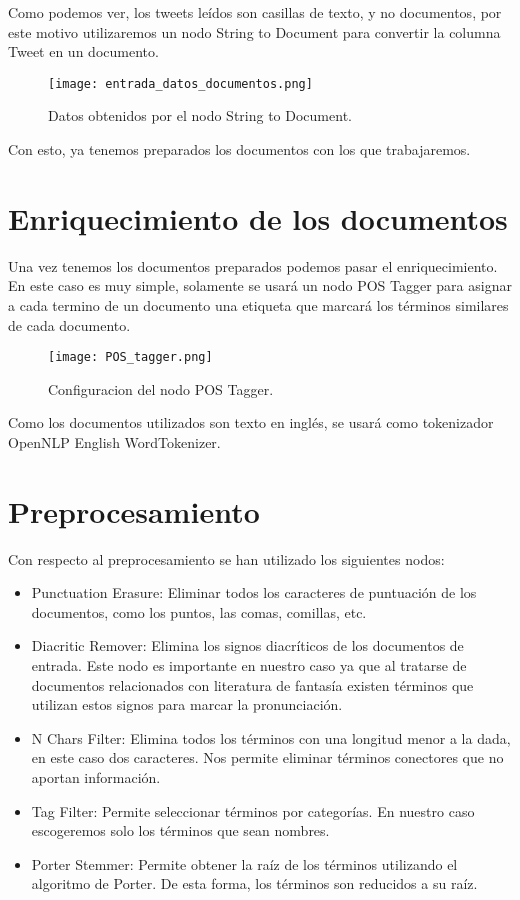 Como podemos ver, los tweets leídos son casillas de texto, y no documentos, por este motivo utilizaremos un nodo String to Document para convertir la columna Tweet en un documento.


\begin{figure}[H]
	\centering
	\texttt{[image: entrada\_datos\_documentos.png]}
	\caption{Datos obtenidos por el nodo String to Document.}
	\label{fig:entrada_datos_documentos}
\end{figure}


Con esto, ya tenemos preparados los documentos con los que trabajaremos.

\section{Enriquecimiento de los documentos}

Una vez tenemos los documentos preparados podemos pasar el enriquecimiento. En este caso es muy simple, solamente se usará un nodo POS Tagger para asignar a cada termino de un documento una etiqueta que marcará los términos similares de cada documento.

\begin{figure}[H]
	\centering
	\texttt{[image: POS\_tagger.png]}
	\caption{Configuracion del nodo POS Tagger.}
	\label{fig:POStagger}
\end{figure}

Como los documentos utilizados son texto en inglés, se usará como tokenizador OpenNLP English WordTokenizer.


\section{Preprocesamiento}

Con respecto al preprocesamiento se han utilizado los siguientes nodos:

\begin{itemize}
	\item Punctuation Erasure: Eliminar todos los caracteres de puntuación de los documentos, como los puntos, las comas, comillas, etc.
	\item Diacritic Remover: Elimina los signos diacríticos de los documentos de entrada. Este nodo es importante en nuestro caso ya que al tratarse de documentos relacionados con literatura de fantasía existen términos que utilizan estos signos para marcar la pronunciación.
	\item N Chars Filter: Elimina todos los términos con una longitud menor a la dada, en este caso dos caracteres. Nos permite eliminar términos conectores que no aportan información.
	\item Tag Filter: Permite seleccionar términos por categorías. En nuestro caso escogeremos solo los términos que sean nombres.
	\item Porter Stemmer: Permite obtener la raíz de los términos utilizando el algoritmo de Porter. De esta forma, los términos son reducidos a su raíz.
\end{itemize}

